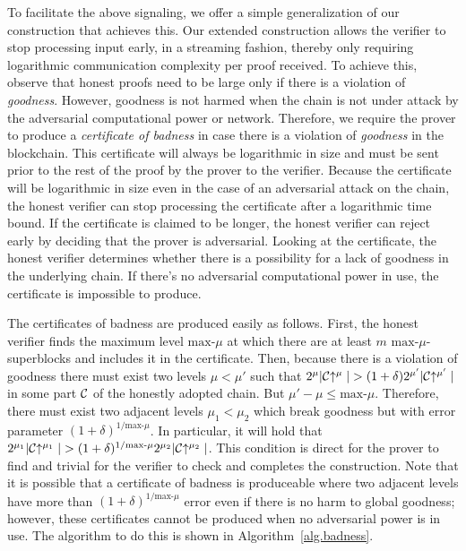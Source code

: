 To facilitate the above signaling, we offer a simple generalization of our
construction that achieves this. Our extended construction allows the verifier
to stop processing input early, in a streaming fashion, thereby only requiring
logarithmic communication complexity per proof received. To achieve this,
observe that honest proofs need to be large only if there is a violation of
\textit{goodness}. However, goodness is not harmed when the chain is not under
attack by the adversarial computational power or network. Therefore, we require
the prover to produce a \textit{certificate of badness} in case there is a
violation of \textit{goodness} in the blockchain. This certificate will always
be logarithmic in size and must be sent prior to the rest of the proof by the
prover to the verifier. Because the certificate will be logarithmic in size even
in the case of an adversarial attack on the chain, the honest verifier can stop
processing the certificate after a logarithmic time bound. If the certificate is
claimed to be longer, the honest verifier can reject early by deciding that the
prover is adversarial. Looking at the certificate, the honest verifier
determines whether there is a possibility for a lack of goodness in the
underlying chain. If there's no adversarial computational power in use, the
certificate is impossible to produce.

The certificates of badness are produced easily as follows. First, the honest
verifier finds the maximum level $\text{max-}\mu$ at which there are at least
$m$ $\text{max-}\mu$-superblocks and includes it in the certificate. Then,
because there is a violation of goodness there must exist two levels $\mu <
\mu'$ such that $2^\mu|\mathcal{C}\negthickspace\uparrow^\mu| > (1 +
\delta)2^{\mu'}|\mathcal{C}\negthickspace\uparrow^{\mu'}|$ in some part $\mathcal{C}$ of the honestly
adopted chain. But $\mu' - \mu \leq \text{max-}\mu$. Therefore, there must exist
two adjacent levels $\mu_1 < \mu_2$ which break goodness but with error
parameter $(1 + \delta)^{1/{\text{max-}\mu}}$. In particular, it will hold that
$2^{\mu_1}|\mathcal{C}\negthickspace\uparrow^{\mu_1}| > (1 +
\delta)^{1/{\text{max-}\mu}}2^{\mu_2}|\mathcal{C}\negthickspace\uparrow^{\mu_2}|$. This condition
is direct for the prover to find and trivial for the verifier to check and
completes the construction. Note that it is possible that a certificate of
badness is produceable where two adjacent levels have more than $(1 +
\delta)^{1/{\text{max-}\mu}}$ error even if there is no harm to global goodness;
however, these certificates cannot be produced when no adversarial power is in
use. The algorithm to do this is shown in Algorithm~\ref{alg.badness}.

